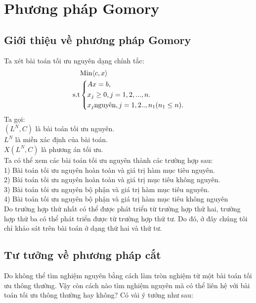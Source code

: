 \documentclass[12pt,a4paper]{report}
\begin{document}
\section{Phương pháp Gomory}
\subsection{ Giới thiệu về phương pháp Gomory}
Ta xét bài toán tối ưu nguyên dạng chính tắc:\\
\begin{equation}\label{BTNchinhtac}
     \begin{split}
          & {\rm{Min}} \langle c,x \rangle\\
          \rm{s.t} &\left\{\begin{split}
            & Ax= b,\\
           & x_j \ge 0, j=1,2,...,n.\\
            & x_j \text{nguyên}, j=1,2..,n_1 (n_1\le n).\\
           \end{split}\right.
       \end{split}
   \end{equation}
   Ta gọi:\\
   $(L^N,C)$ là bài toán tối ưu nguyên.\\
$L^N$ là miền xác định của bài toán.\\
$X(L^N,C) $ là phương án tối ưu.\\
   Ta có thể xem các bài toán tối ưu nguyên thành các trường hợp sau:\\
   1) Bài toán tối ưu nguyên hoàn toàn và giá trị hàm mục tiêu nguyên.\\
   2) Bài toán tối ưu nguyên hoàn toàn và giá trị mục tiêu không nguyên.\\
   3) Bài toán tối ưu nguyên bộ phận và giá trị hàm mục tiêu nguyên.\\
   4) Bài toán tối ưu nguyên bộ phận và giá trị hàm mục tiêu không nguyên\\
   Do trường hợp thứ nhất có thể được phát triển từ trường hợp thứ hai, trường hợp thứ ba có thể phát triển được từ trường hợp thứ tư. Do đó, ở đây chúng tôi chỉ khảo sát trên bài toán ở dạng thứ hai và thứ tư.\\
\subsection{ Tư tưởng về phương pháp cắt}
Do không thể tìm nghiệm nguyên bằng cách làm tròn nghiệm từ một bài toán tối ưu thông thường. Vậy còn cách nào tìm nghiệm nguyên mà có thể liên hệ với bài toán tối ưu thông thường hay không? Có vài ý tưởng như sau:\\
\end{document}

